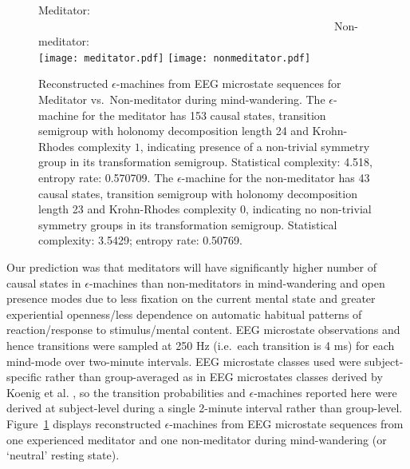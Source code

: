 \documentclass[journal]{IEEEtran}
\begin{document}
\begin{figure}[!ht]
\begin{center}
Meditator: \ \ \ \ \ \ \ \ \ \ \ \ \ \ \ \ \ \ \ \ \ \ \ \ \ \ \ \ \ \ \ \ \ \ \ \ \ \ \ \ \ \ \   \ \ \ \ \ \ \ \ \ \   Non-meditator:\\
 \texttt{[image: meditator.pdf]}
  \texttt{[image: nonmeditator.pdf]}
  \end{center}
 \caption{Reconstructed $\epsilon$-machines from EEG microstate sequences for Meditator vs.\ Non-meditator during mind-wandering.
  The $\epsilon$-machine for the meditator has 153 causal states, transition semigroup with holonomy decomposition length 24 and Krohn-Rhodes complexity $1$, indicating 
presence of a non-trivial symmetry group in its transformation semigroup. Statistical complexity: 4.518, entropy rate: 0.570709.  The $\epsilon$-machine for the non-meditator has 43 causal states, transition semigroup with holonomy decomposition length 23 and Krohn-Rhodes complexity $0$, indicating 
no non-trivial symmetry groups in its transformation semigroup. Statistical complexity: 3.5429;  entropy rate: 0.50769.
}
 \label{Meditators}
 \end{figure}
 




Our prediction was that meditators will have  significantly higher number of causal states in $\epsilon$-machines than non-meditators in mind-wandering and open presence modes due to less fixation on the current mental state and greater experiential openness/less dependence on automatic habitual patterns of reaction/response to stimulus/mental content. EEG microstate observations and hence transitions were sampled at 250 Hz (i.e.\ each transition is 4 ms) for each mind-mode  over two-minute intervals. EEG microstate classes used were subject-specific rather than group-averaged as in EEG microstates classes derived by Koenig et al. \cite{Koenig2002}, so the transition probabilities and $\epsilon$-machines reported here were derived at subject-level during a single 2-minute interval rather than group-level. 
Figure~\ref{Meditators} displays reconstructed $\epsilon$-machines from EEG microstate sequences from one experienced meditator and
one non-meditator during mind-wandering (or `neutral' resting state). 
\end{document}
